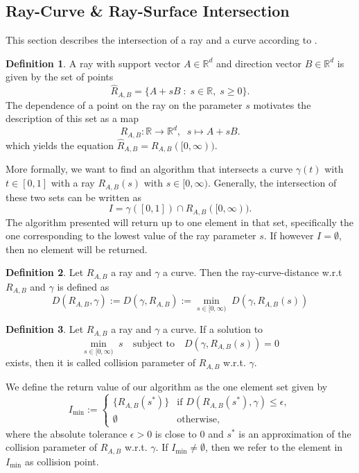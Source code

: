 \documentclass[a4paper, 11pt]{report}
\theoremstyle{definition}
\newtheorem{definition}{Definition}[section]
\begin{document}
\subsection{Ray-Curve \& Ray-Surface Intersection}\label{subsec:raymarching}
	This section describes the intersection of a ray and a curve according to \cite{Hart1996}.

	\begin{definition}
		A ray with support vector $A \in \mathbb{R}^d$ and direction vector $B \in \mathbb{R}^d$ is given by the set of points
			\begin{equation*}
				\hat R_{A,B} = \{A + sB \;:\; s \in \mathbb{R},\; s \geq 0\}.
			\end{equation*}
		The dependence of a point on the ray on the parameter $s$ motivates the description of this set as a map
			$$R_{A,B}: \mathbb{R} \rightarrow \mathbb{R}^d,\;\; s \mapsto A+sB.$$
		which yields the equation $\hat R_{A,B} = R_{A,B}([0,\infty))$.
	\end{definition}

	More formally, we want to find an algorithm that intersects a curve $\gamma(t)$ with $t \in [0, 1]$ with a ray $R_{A,B}(s)$ with $s \in [0, \infty)$. Generally, the intersection of these two sets can be written as
		$$I = \gamma([0,1]) \cap R_{A,B}([0,\infty)).$$
	The algorithm presented will return up to one element in that set, specifically the one corresponding to the lowest value of the ray parameter $s$. If however $I = \emptyset$, then no element will be returned.

	\begin{definition}
		Let $R_{A,B}$ a ray and $\gamma$ a curve. Then the ray-curve-distance w.r.t $R_{A,B}$ and $\gamma$ is defined as
			$$ D(R_{A,B}, \gamma) := D(\gamma, R_{A,B}) := \underset{s\in[0,\infty)}{\min} \; D(\gamma, R_{A,B}(s))$$
	\end{definition}
	
	\begin{definition}\label{def:raycollisionparameter}
		Let $R_{A,B}$ a ray and $\gamma$ a curve. If a solution to 
			$$\underset{s\in[0,\infty)}{\min} \; s \quad \text{subject to} \quad D(\gamma, R_{A,B}(s)) = 0$$
		exists, then it is called collision parameter of $R_{A,B}$ w.r.t. $\gamma$.
	\end{definition}

	We define the return value of our algorithm as the one element set given by
		$$ I_{\min} := 
			\begin{cases}
				\{R_{A,B}(s^*)\} 	&\text{if } D(R_{A,B}(s^*), \gamma) \leq \epsilon, \\
				\emptyset			&\text{otherwise,}	
			\end{cases}
		$$
	where the absolute tolerance $\epsilon > 0$ is close to $0$ and $s^*$ is an approximation of the collision parameter of $R_{A,B}$ w.r.t. $\gamma$. If $I_{\min} \neq \emptyset$, then we refer to the element in $I_{\min}$ as collision point.
\end{document}
